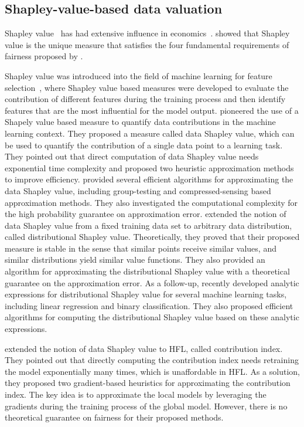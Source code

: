 \subsection{Shapley-value-based data valuation}
Shapley value~\citep{shapley201617} has had extensive influence in economics~\cite{gul1989bargaining}. \citet{dubey1975uniqueness} showed that Shapley value is the unique measure that satisfies the four fundamental requirements of fairness proposed by \citet{shapley201617}. 

Shapley value was introduced into the field of machine learning for feature selection~\citep{cohen2005feature, lundberg2017unified,strumbelj2010efficient}, where Shapley value based measures were developed to evaluate the contribution of different features during the training process and then identify features that are the most influential for the model output. \citet{ghorbani2019data} pioneered the use of a Shapely value based measure to quantify data contributions in the machine learning context. They proposed a measure called data Shapley value, which can be used to quantify the contribution of a single data point to a learning task. They pointed out that direct computation of data Shapley value needs exponential time complexity and proposed two heuristic approximation methods to improve efficiency. \citet{jia2019towards} provided several efficient algorithms for approximating the data Shapley value, including group-testing and compressed-sensing based approximation methods. They also investigated the computational complexity for the high probability guarantee on approximation error. \citet{ghorbani2020distributional} extended the notion of data Shapley value from a fixed training data set to arbitrary data distribution, called distributional Shapley value. Theoretically, they proved that their proposed measure is stable in the sense that similar points receive similar values, and similar distributions yield similar value functions. They also provided an algorithm for approximating the distributional Shapley value with a theoretical guarantee on the approximation error. As a follow-up,  \citet{kwon2021efficient} recently developed analytic expressions for distributional Shapley value for several machine learning tasks, including linear regression and binary classification. They also proposed efficient algorithms for computing the distributional Shapley value based on these analytic expressions. 

\citet{song2019profit} extended the notion of data Shapley value to HFL, called contribution index. They pointed out that directly computing the contribution index needs retraining the model exponentially many times, which is unaffordable in HFL. As a solution, they proposed two gradient-based heuristics for approximating the contribution index. The key idea is to approximate the local models by leveraging the gradients during the training process of the global model. However, there is no theoretical guarantee on fairness for their proposed methods. 


